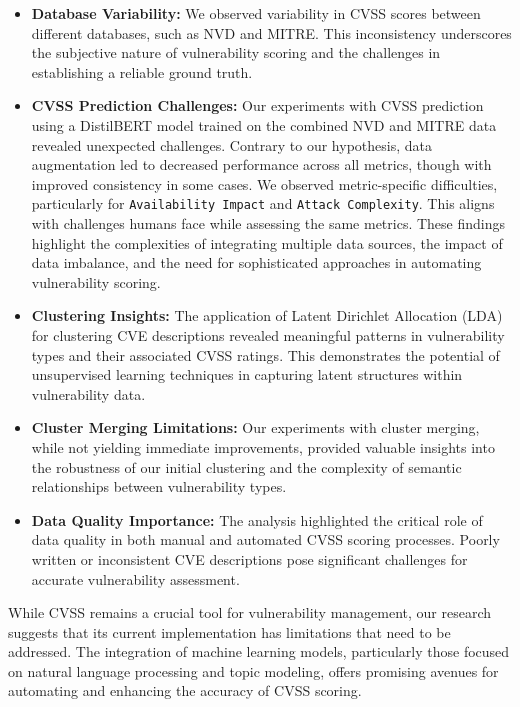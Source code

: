 \documentclass[12pt]{article}
\begin{document}
\begin{itemize}

	\item \textbf{Database Variability:} We observed variability in CVSS scores between
	      different databases, such as NVD and MITRE. This inconsistency underscores the subjective
	      nature of vulnerability scoring and the challenges in establishing a reliable ground truth.

	\item \textbf{CVSS Prediction Challenges:} Our experiments with CVSS prediction using a
	      DistilBERT model trained on the combined NVD and MITRE data revealed unexpected challenges.
	      Contrary to our hypothesis, data augmentation led to decreased performance across all
	      metrics, though with improved consistency in some cases. We observed metric-specific
	      difficulties, particularly for \texttt{Availability Impact} and \texttt{Attack Complexity}.
	      This aligns with challenges humans face while assessing the same metrics. These findings
	      highlight the complexities of integrating multiple data sources, the impact of data
	      imbalance, and the need for sophisticated approaches in automating vulnerability scoring.

	\item \textbf{Clustering Insights:} The application of Latent Dirichlet Allocation (LDA) for
	      clustering CVE descriptions revealed meaningful patterns in vulnerability types and their
	      associated CVSS ratings. This demonstrates the potential of unsupervised learning techniques
	      in capturing latent structures within vulnerability data.

	\item \textbf{Cluster Merging Limitations:} Our experiments with cluster merging, while not
	      yielding immediate improvements, provided valuable insights into the robustness of our
	      initial clustering and the complexity of semantic relationships between vulnerability types.

	\item \textbf{Data Quality Importance:} The analysis highlighted the critical role of data
	      quality in both manual and automated CVSS scoring processes. Poorly written or inconsistent
	      CVE descriptions pose significant challenges for accurate vulnerability assessment.


\end{itemize}

While CVSS remains a crucial tool for vulnerability management, our research suggests that its
current implementation has limitations that need to be addressed. The integration of machine
learning models, particularly those focused on natural language processing and topic modeling,
offers promising avenues for automating and enhancing the accuracy of CVSS scoring.
\end{document}
